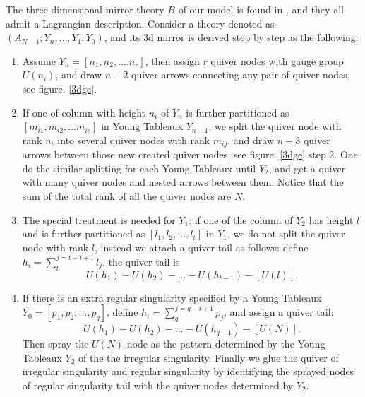 \documentclass[a4paper,11pt]{article}
\begin{document}
The three dimensional mirror theory $B$ of our model is found in \cite{Xie:2012hs}, and they all admit a Lagrangian description. 
 Consider a theory denoted as $(A_{N-1}; Y_{n},\ldots, Y_1; Y_0)$, and  its 3d mirror is derived step by step as the following:
 \begin{enumerate}
\item  Assume $Y_n =[n_1,n_2,....n_r]$, then assign $r$ quiver nodes with
gauge group $U(n_i)$, and draw $n-2$ quiver arrows connecting any pair of quiver nodes, see figure. \ref{3dge}.

\item 
If one of column with height $n_i$ of $Y_{n}$ is further partitioned as $[m_{i1}, m_{i2},\ldots m_{is}]$ in Young  Tableaux $Y_{n-1}$, we split the quiver node with rank $n_i$ into  several quiver nodes with rank $m_{ij}$, and draw $n-3$ 
quiver arrows between those new created quiver nodes,  see figure. \ref{3dge} step 2.
One do the similar splitting for each Young Tableaux until  $Y_2$, and  get a quiver  with many quiver nodes and nested arrows 
between them. Notice that the sum of the total rank  of all the quiver nodes are $N$.


\item
The special treatment is needed for $Y_1$:  if  one of the column of $Y_2$ has height $l$ and 
is further partitioned as $[l_1,l_2,\ldots ,l_t]$ in $Y_1$,  we do not split the quiver node with rank $l$, 
instead we attach a quiver tail as follows: define $h_i=\sum_{t}^{j=t-i+1} l_j$, the quiver tail is
\begin{equation}
U(h_1)-U(h_2)-\ldots-U(h_{t-1})-[U(l)].
\end{equation}


\item If there is an extra regular singularity specified by a Young Tableaux $Y_0=[p_1,p_2,\ldots, p_q]$, define $h_i=\sum_{q}^{j=q-i+1} p_j$, and assign a quiver tail:
\begin{equation}
U(h_1)-U(h_2)-\ldots-U(h_{q-1})-[U(N)].
\end{equation}
Then spray the $U(N)$ node as the pattern determined by the Young Tableaux $Y_2$ of the  the irregular singularity. 
Finally we glue the quiver of irregular singularity and regular singularity by identifying the sprayed nodes of regular singularity tail with the quiver nodes determined by $Y_2$.

\end{enumerate}
\end{document}
